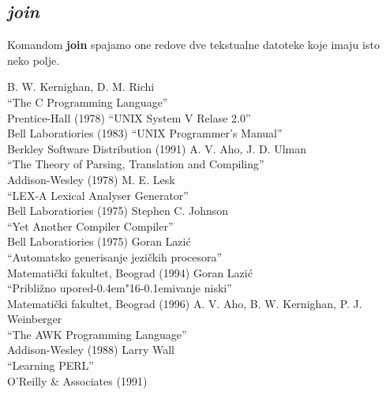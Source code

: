 \documentclass[12pt,a4paper,titlepage]{article}
\def\d{d\kern-0.4em\char"16\kern-0.1em}
\begin{document}
    \subsection{\em join}
      Komandom {\bf join} spajamo one redove dve tekstualne datoteke koje
      imaju isto neko polje.
%
%
  \newpage
  \begin{thebibliography}{}
    B. W. Kernighan, D. M. Richi\\
    ``The C Programming Language''\\
    Prentice-Hall (1978)
    ``UNIX System V Relase 2.0''\\
    Bell Laboratiories (1983)
    ``UNIX Programmer's Manual''\\
    Berkley Software Distribution (1991)
    A. V. Aho, J. D. Ulman\\
    ``The Theory of Parsing, Translation and Compiling''\\
    Addison-Wesley (1978)
    M. E. Lesk\\
    ``LEX-A Lexical Analyser Generator''\\
    Bell Laboratiories (1975)
    Stephen C. Johnson\\
    ``Yet Another Compiler Compiler''\\
    Bell Laboratiories (1975)
    Goran Lazi\'c\\
    ``Automatsko generisanje jezi\v ckih procesora''\\
    Matemati\v cki fakultet, Beograd (1994)
    Goran Lazi\'c\\
    ``Pribli\v zno upore\d ivanje niski''\\
    Matemati\v cki fakultet, Beograd (1996)
    A. V. Aho, B. W. Kernighan, P. J. Weinberger\\
    ``The AWK Programming Language''\\
    Addison-Wesley (1988)
    Larry Wall\\
    ``Learning PERL''\\
    O'Reilly \& Associates (1991)
  \end{thebibliography}
\end{document}
